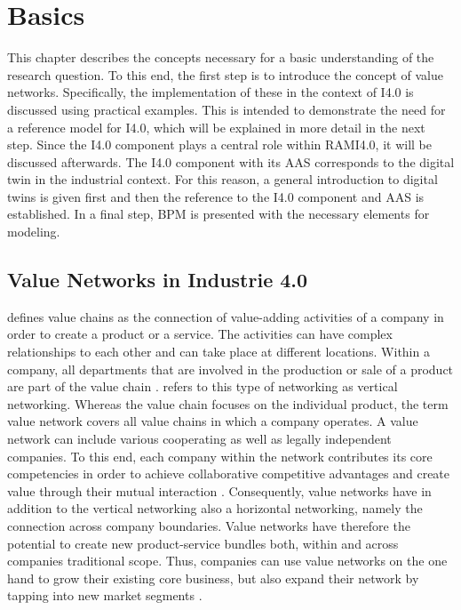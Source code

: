 \chapter{Basics}
This chapter describes the concepts necessary for a basic understanding of the research question. To this end, the first step is to introduce the concept of value networks. Specifically, the implementation of these in the context of \ac{I4.0} is discussed using practical examples. This is intended to demonstrate the need for a reference model for \ac{I4.0}, which will be explained in more detail in the next step. Since the \ac{I4.0} component plays a central role within \ac{RAMI4.0}, it will be discussed afterwards. The \ac{I4.0} component with its \ac{AAS} corresponds to the digital twin in the industrial context. For this reason, a general introduction to digital twins is given first and then the reference to the \ac{I4.0} component and \ac{AAS} is established. In a final step, \ac{BPM} is presented with the necessary elements for modeling.

\section{Value Networks in Industrie 4.0} \label{sec:valuenetworks}
\citet[p. 6]{Sturgeon2001HowNetworks} defines value chains as the connection of value-adding activities of a company in order to create a product or a service. The activities can have complex relationships to each other and can take place at different locations. Within a company, all departments that are involved in the production or sale of a product are part of the value chain \cite[p. 10]{Sturgeon2001HowNetworks}. \citeauthor{Sturgeon2001HowNetworks} refers to this type of networking as vertical networking. Whereas the value chain focuses on the individual product, the term value network covers all value chains in which a company operates. A value network can include various cooperating as well as legally independent companies. To this end, each company within the network contributes its core competencies in order to achieve collaborative competitive advantages and create value through their mutual interaction \cite[p. 3]{Bach2010GeschaftsmodelleGrundlagen}. Consequently, value networks have in addition to the vertical networking also a horizontal networking, namely the connection across company boundaries. Value networks have therefore the potential to create new product-service bundles both, within and across companies traditional scope. Thus, companies can use value networks on the one hand to grow their existing core business, but also expand their network by tapping into new market segments \cite[p. 22]{Acatech2013Recommendations4.0}.

